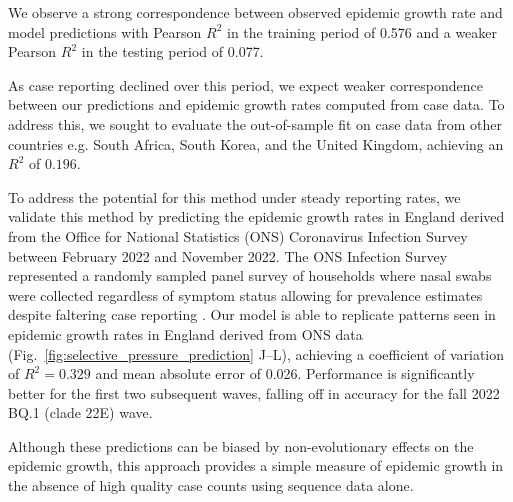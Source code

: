 \documentclass[11pt,oneside,letterpaper]{article}
\begin{document}
We observe a strong correspondence between observed epidemic growth rate and model predictions with Pearson $R^2$ in the training period of 0.576 and a weaker Pearson $R^2$ in the testing period of 0.077.

As case reporting declined over this period, we expect weaker correspondence between our predictions and epidemic growth rates computed from case data.
To address this, we sought to evaluate the out-of-sample fit on case data from other countries e.g. South Africa, South Korea, and the United Kingdom, achieving an $R^2$ of $0.196$.

To address the potential for this method under steady reporting rates, we validate this method by predicting the epidemic growth rates in England derived from the Office for National Statistics (ONS) Coronavirus Infection Survey between February 2022 and November 2022.
The ONS Infection Survey represented a randomly sampled panel survey of households where nasal swabs were collected regardless of symptom status allowing for prevalence estimates despite faltering case reporting \cite{pouwels2021community}.
Our model is able to replicate patterns seen in epidemic growth rates in England derived from ONS data (Fig.~\ref{fig:selective_pressure_prediction} J--L), achieving a coefficient of variation of $R^2 = 0.329$ and mean absolute error of 0.026.
Performance is significantly better for the first two subsequent waves, falling off in accuracy for the fall 2022 BQ.1 (clade 22E) wave.

Although these predictions can be biased by non-evolutionary effects on the epidemic growth, this approach provides a simple measure of epidemic growth in the absence of high quality case counts using sequence data alone.
\end{document}
